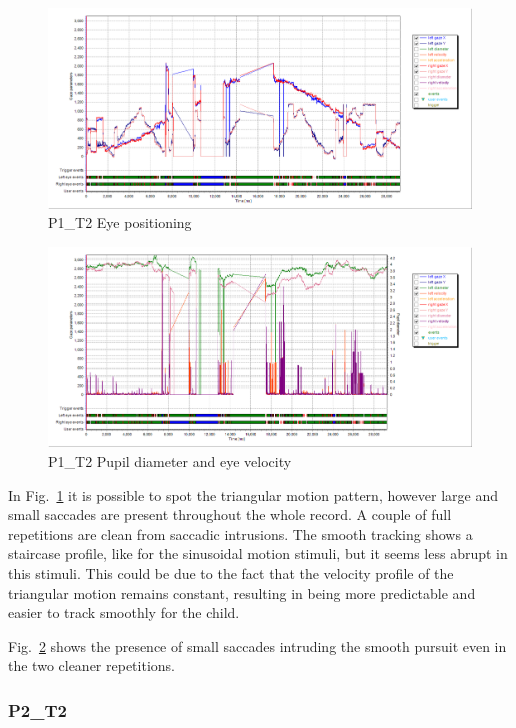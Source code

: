 \begin{figure}[t]
  \centering
  \includegraphics[width=.8\textwidth]{figures/graphs/P1_T2(triangular)_XY.png}
  \caption[P1\_T2 Eye positioning]{P1\_T2 Eye positioning}
  \label{fig:P1_T2_pos}
\end{figure}

\begin{figure}[t]
  \centering
  \includegraphics[width=.8\textwidth]{figures/graphs/P1_T2(triangular)_VP.png}
  \caption[P1\_T2 Pupil size and velocity profile]{P1\_T2 Pupil diameter and eye velocity}
  \label{fig:P1_T2_vel}
\end{figure}

In Fig.~\ref{fig:P1_T2_pos} it is possible to spot the triangular motion pattern, however large and small saccades are present throughout the whole record. A couple of full repetitions are clean from saccadic intrusions. The smooth tracking shows a staircase profile, like for the sinusoidal motion stimuli, but it seems less abrupt in this stimuli. This could be due to the fact that the velocity profile of the triangular motion remains constant, resulting in being more predictable and easier to track smoothly for the child.

Fig.~\ref{fig:P1_T2_vel} shows the presence of small saccades intruding the smooth pursuit even in the two cleaner repetitions.


\subsubsection{P2\_T2}
\label{sec:P2_T2}

